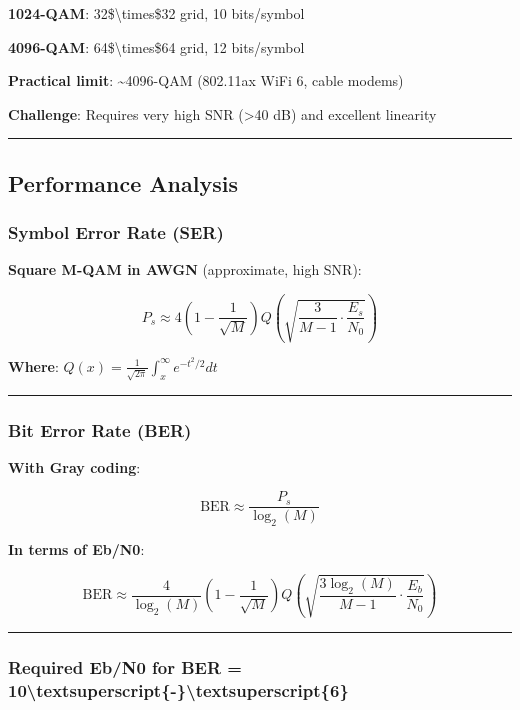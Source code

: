 \textbf{1024-QAM}: 32\$\textbackslash times\$32 grid, 10 bits/symbol

\textbf{4096-QAM}: 64\$\textbackslash times\$64 grid, 12 bits/symbol

\textbf{Practical limit}: \textasciitilde4096-QAM (802.11ax WiFi 6,
cable modems)

\textbf{Challenge}: Requires very high SNR (\textgreater40 dB) and
excellent linearity

\begin{center}\rule{0.5\linewidth}{0.5pt}\end{center}

\subsection{Performance Analysis}\label{performance-analysis}

\subsubsection{Symbol Error Rate (SER)}\label{symbol-error-rate-ser}

\textbf{Square M-QAM in AWGN} (approximate, high SNR):

\[
P_s \approx 4\left(1 - \frac{1}{\sqrt{M}}\right) Q\left(\sqrt{\frac{3}{M-1} \cdot \frac{E_s}{N_0}}\right)
\]

\textbf{Where}:
\(Q(x) = \frac{1}{\sqrt{2\pi}} \int_x^\infty e^{-t^2/2} dt\)

\begin{center}\rule{0.5\linewidth}{0.5pt}\end{center}

\subsubsection{Bit Error Rate (BER)}\label{bit-error-rate-ber}

\textbf{With Gray coding}:

\[
\text{BER} \approx \frac{P_s}{\log_2(M)}
\]

\textbf{In terms of Eb/N0}:

\[
\text{BER} \approx \frac{4}{\log_2(M)}\left(1 - \frac{1}{\sqrt{M}}\right) Q\left(\sqrt{\frac{3\log_2(M)}{M-1} \cdot \frac{E_b}{N_0}}\right)
\]

\begin{center}\rule{0.5\linewidth}{0.5pt}\end{center}

\subsubsection{Required Eb/N0 for BER =
10\textbackslash textsuperscript\{-\}\textbackslash textsuperscript\{6\}}\label{required-ebn0-for-ber-10ux2076}

